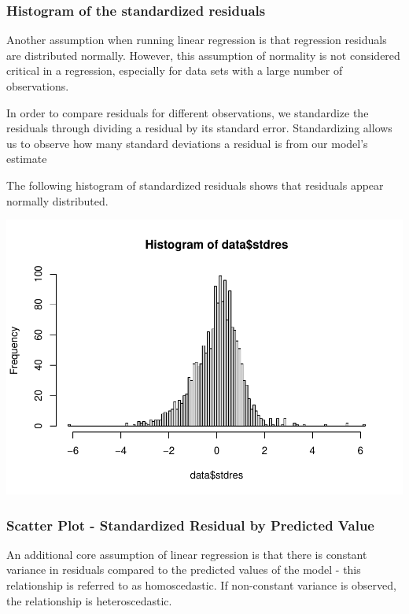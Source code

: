 \documentclass[
]{article}
\begin{document}
\hypertarget{histogram-of-the-standardized-residuals}{%
\subsubsection{Histogram of the standardized
residuals}\label{histogram-of-the-standardized-residuals}}

Another assumption when running linear regression is that regression
residuals are distributed normally. However, this assumption of
normality is not considered critical in a regression, especially for
data sets with a large number of observations.

In order to compare residuals for different observations, we standardize
the residuals through dividing a residual by its standard error.
Standardizing allows us to observe how many standard deviations a
residual is from our model's estimate

The following histogram of standardized residuals shows that residuals
appear normally distributed.

\includegraphics{HW1-Regression_files/figure-latex/resid plot-1.pdf}

\hypertarget{scatter-plot---standardized-residual-by-predicted-value}{%
\subsubsection{Scatter Plot - Standardized Residual by Predicted
Value}\label{scatter-plot---standardized-residual-by-predicted-value}}

An additional core assumption of linear regression is that there is
constant variance in residuals compared to the predicted values of the
model - this relationship is referred to as homoscedastic. If
non-constant variance is observed, the relationship is heteroscedastic.
\end{document}
